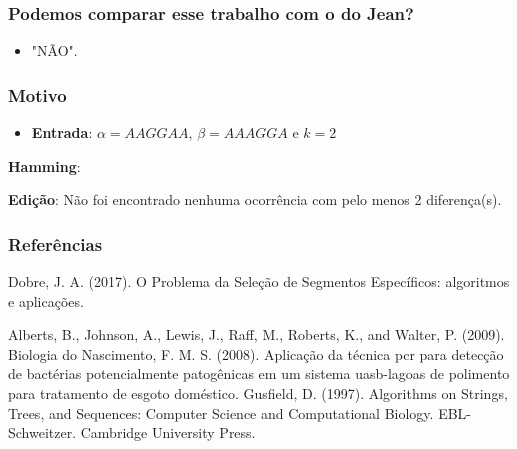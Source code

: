 \documentclass[10pt, compress]{beamer}
\newcommand{\aaa}{A}
\newcommand{\gga}{G}
\begin{document}
\begin{frame}[fragile]
	\frametitle{Podemos comparar esse trabalho com o do Jean?}
    
    \begin{itemize}
    	\item "NÃO".
        \centering
    \end{itemize}

\end{frame}

\begin{frame}[fragile]
	\frametitle{Motivo}
	\begin{itemize}
		\item \textbf{Entrada}: $\alpha = AAGGAA$, $\beta = AAAGGA$ e $k = 2$
	\end{itemize}
    
    \textbf{Hamming}:
    \begin{center}
	\end{center}
    
    \textbf{Edição}: Não foi encontrado nenhuma ocorrência com pelo menos 2 diferença(s).
    
\end{frame}


\begin{frame}[fragile]
	\frametitle{Referências}
    \begin{thebibliography}{9}
    	 Dobre, J. A. (2017). O Problema da Seleção de Segmentos Específicos: algoritmos e aplicações.
        
       	 Alberts, B., Johnson, A., Lewis, J., Raff, M., Roberts, K., and Walter, P. (2009). Biologia
		 do Nascimento, F. M. S. (2008). Aplicação da técnica pcr para detecção de bactérias
potencialmente patogênicas em um sistema uasb-lagoas de polimento para tratamento
de esgoto doméstico.
		 Gusfield, D. (1997). Algorithms on Strings, Trees, and Sequences: Computer Science and
Computational Biology. EBL-Schweitzer. Cambridge University Press.
    \end{thebibliography}
\end{frame}
\end{document}
